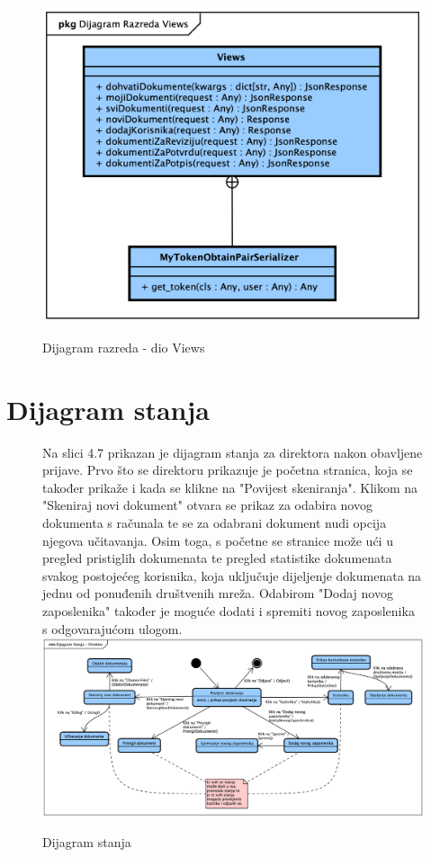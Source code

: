 			\begin{figure}[H]
				\
				\includegraphics[width=\textwidth]{slike/Class_Views.png}
				\caption{Dijagram razreda - dio Views}
				\label{fig:class_views}
			\end{figure}

			
			\eject
		
		\section{Dijagram stanja}
			
			\begin{figure}[H]
				Na slici 4.7 prikazan je dijagram stanja za direktora nakon obavljene prijave. Prvo što se direktoru prikazuje je početna stranica, koja se također
				prikaže i kada se klikne na "Povijest skeniranja". Klikom na "Skeniraj novi dokument" otvara se prikaz za odabira novog dokumenta s računala te se
				za odabrani dokument nudi opcija njegova učitavanja. Osim toga, s početne se stranice može ući u pregled pristiglih dokumenata te pregled statistike
				dokumenata svakog postojećeg korisnika, koja uključuje dijeljenje dokumenata na jednu od ponuđenih društvenih mreža. Odabirom "Dodaj novog zaposlenika"
				također je moguće dodati i spremiti novog zaposlenika s odgovarajućom ulogom.
				\newline
				\includegraphics[width=\textwidth]{slike/StateMachine.png}
				\caption{Dijagram stanja}
				\label{fig:StateMachine}
			\end{figure}
			\eject 
		
